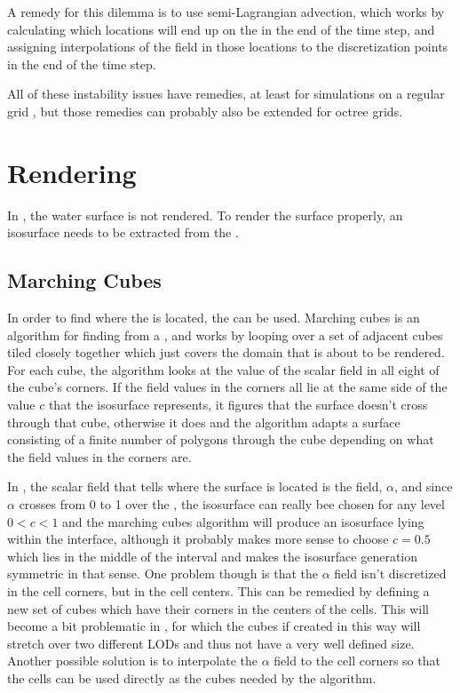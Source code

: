 A remedy for this dilemma is to use semi-Lagrangian advection, which works by calculating which locations will end up on the  in the end of the time step, and assigning interpolations of the field in those locations to the discretization points in the end of the time step.

All of these instability issues have remedies, at least for simulations on a regular grid \citep{Stam1999,Kwatra2009,Lentine2012}, but those remedies can probably also be extended for octree grids.

\section{Rendering}

In \thisprojectwork, the water surface is not rendered. To render the surface properly, an isosurface needs to be extracted from the .

\subsection{Marching Cubes}
\label{sec:marchingcubesdescription}

In order to find where the  is located, the   can be used. Marching cubes is an algorithm for finding \isosurfaces from a , and works by looping over a set of adjacent cubes tiled closely together which just covers the domain that is about to be rendered. For each cube, the algorithm looks at the value of the scalar field in all eight of the cube's corners. If the field values in the corners all lie at the same side of the value $c$ that the isosurface represents, it figures that the surface doesn't cross through that cube, otherwise it does and the algorithm adapts a surface consisting of a finite number of polygons through the cube depending on what the field values in the corners are.

In \thisprojectwork, the scalar field that tells where the surface is located is the  {field}, $\alpha$, and since $\alpha$ crosses from 0 to 1 over the \interface, the isosurface can really bee chosen for any level $0 < c < 1$ and the marching cubes algorithm will produce an isosurface lying within the interface, although it probably makes more sense to choose $c = 0.5$ which lies in the middle of the interval and makes the isosurface generation symmetric in that sense. One problem though is that the $\alpha$ field isn't discretized in the cell corners, but in the cell centers. This can be remedied by defining a new set of cubes which have their corners in the centers of the cells. This will become a bit problematic in , for which the cubes if created in this way will stretch over two different LODs and thus not have a very well defined size. Another possible solution is to interpolate the $\alpha$ field to the cell corners so that the cells can be used directly as the cubes needed by the algorithm.

